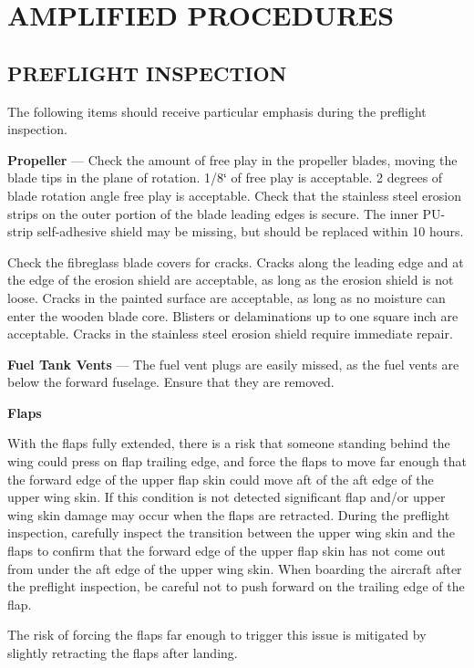\cleardoublepage


\cleardoublepage


\section{AMPLIFIED  PROCEDURES}

\subsection{PREFLIGHT INSPECTION}
The following items should receive particular emphasis during the preflight inspection.

\textbf{Propeller} --- Check the amount of free play in the propeller blades, moving the blade tips in the plane of rotation. 1/8\char`\"{} of free play is acceptable. 2 degrees of blade rotation angle free play is acceptable. Check that the stainless steel erosion strips on the outer portion of the blade leading edges is secure. The inner PU-strip self-adhesive shield may be missing, but should be replaced within 10 hours.

Check the fibreglass blade covers for cracks. Cracks along the leading edge and at the edge of the erosion shield are acceptable, as long as the erosion shield is not loose. Cracks in the painted surface are acceptable, as long as no moisture can enter the wooden blade core. Blisters or delaminations up to one square inch are acceptable. Cracks in the stainless steel erosion shield require immediate repair.

\textbf{Fuel Tank Vents} --- The fuel vent plugs are easily missed, as the fuel vents are below the forward fuselage. Ensure that they are removed.

\textbf{Flaps}
\begin{Note}[CAUTION]
With the flaps fully extended, there is a risk that someone standing behind the wing could press on flap trailing edge, and force the flaps to move far enough that the forward edge of the upper flap skin could move aft of the aft edge of the upper wing skin. If this condition is not detected significant flap and/or upper wing skin damage may occur when the flaps are retracted. During the preflight inspection, carefully inspect the transition between the upper wing skin and the flaps to confirm that the forward edge of the upper flap skin has not come out from under the aft edge of the upper wing skin. When boarding the aircraft after the preflight inspection, be careful not to push forward on the trailing edge of the flap. 

The risk of forcing the flaps far enough to trigger this issue is mitigated by slightly retracting the flaps after landing.
\end{Note}


